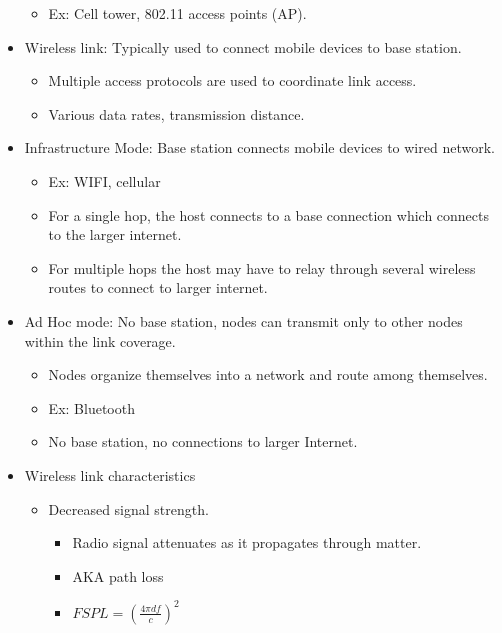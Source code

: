 \begin{itemize}
  \begin{itemize}
  \tightlist
  \item
    Ex: Cell tower, 802.11 access points (AP).
  \end{itemize}
\item
  Wireless link: Typically used to connect mobile devices to base
  station.

  \begin{itemize}
  \tightlist
  \item
    Multiple access protocols are used to coordinate link access.
  \item
    Various data rates, transmission distance.
  \end{itemize}
\item
  Infrastructure Mode: Base station connects mobile devices to wired
  network.

  \begin{itemize}
  \tightlist
  \item
    Ex: WIFI, cellular
  \item
    For a single hop, the host connects to a base connection which
    connects to the larger internet.
  \item
    For multiple hops the host may have to relay through several
    wireless routes to connect to larger internet.
  \end{itemize}
\item
  Ad Hoc mode: No base station, nodes can transmit only to other nodes
  within the link coverage.

  \begin{itemize}
  \tightlist
  \item
    Nodes organize themselves into a network and route among themselves.
  \item
    Ex: Bluetooth
  \item
    No base station, no connections to larger Internet.
  \end{itemize}
\item
  Wireless link characteristics

  \begin{itemize}
  \tightlist
  \item
    Decreased signal strength.

    \begin{itemize}
    \tightlist
    \item
      Radio signal attenuates as it propagates through matter.
    \item
      AKA path loss
    \item
      \(FSPL = (\frac{4 \pi d f}{c})^2\)


\end{itemize}
\end{itemize}
\end{itemize}
